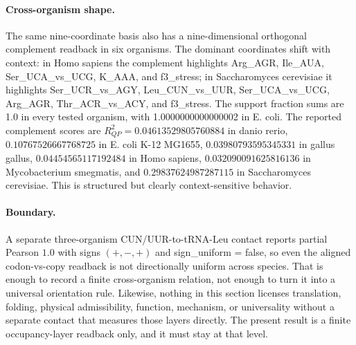 \paragraph{Cross-organism shape.}
The same nine-coordinate basis also has a nine-dimensional orthogonal complement readback in six organisms. The dominant coordinates shift with context: in Homo sapiens the complement highlights Arg\_AGR, Ile\_AUA, Ser\_UCA\_vs\_UCG, K\_AAA, and f3\_stress; in Saccharomyces cerevisiae it highlights Ser\_UCR\_vs\_AGY, Leu\_CUN\_vs\_UUR, Ser\_UCA\_vs\_UCG, Arg\_AGR, Thr\_ACR\_vs\_ACY, and f3\_stress. The support fraction sums are 1.0 in every tested organism, with 1.0000000000000002 in E. coli. The reported complement scores are $R^2_{QP}=0.04613529805760884$ in danio rerio, $0.10767526667768725$ in E. coli K-12 MG1655, $0.03980793595345331$ in gallus gallus, $0.04454565117192484$ in Homo sapiens, $0.032090091625816136$ in Mycobacterium smegmatis, and $0.29837624987287115$ in Saccharomyces cerevisiae. This is structured but clearly context-sensitive behavior.

\paragraph{Boundary.}
A separate three-organism CUN/UUR-to-tRNA-Leu contact reports partial Pearson $1.0$ with signs $(+,-,+)$ and sign\_uniform = false, so even the aligned codon-vs-copy readback is not directionally uniform across species. That is enough to record a finite cross-organism relation, not enough to turn it into a universal orientation rule. Likewise, nothing in this section licenses translation, folding, physical admissibility, function, mechanism, or universality without a separate contact that measures those layers directly. The present result is a finite occupancy-layer readback only, and it must stay at that level.